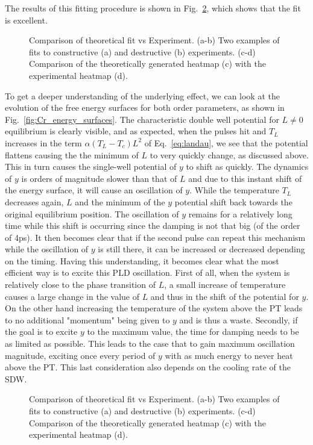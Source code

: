 The results of this fitting procedure is shown in Fig.~\ref{fig:Cr_theoretical_fit}, which shows that the fit is excellent.  
\begin{figure}
\caption{\label{fig:Cr_theoretical_fit} Comparison of theoretical fit vs Experiment. (a-b) Two examples of fits to constructive (a) and destructive (b) experiments. (c-d) Comparison of the theoretically generated heatmap (c) with the experimental heatmap (d).}
\end{figure}
To get a deeper understanding of the underlying effect, we can look at the evolution of the free energy surfaces for both order parameters, as shown in Fig.~\ref{fig:Cr_energy_surfaces}. The characteristic double well potential for $L\neq0$ equilibrium is clearly visible, and as expected, when the pulses hit and $T_L$ increases in the term $\alpha(T_L-T_c)L^2$ of Eq.~\ref{eq:landau}, we see that the potential flattens causing the the minimum of $L$ to very quickly change, as discussed above. This in turn causes the single-well potential of $y$ to shift as quickly. The dynamics of $y$ is orders of magnitude slower than that of $L$ and due to this instant shift of the energy surface, it will cause an oscillation of $y$. While the temperature $T_L$ decreases again, $L$ and the minimum of the $y$ potential shift back towards the original equilibrium position. The oscillation of $y$ remains for a relatively long time while this shift is occurring since the damping is not that big (of the order of 4ps). It then becomes clear that if the second pulse can repeat this mechanism while the oscillation of $y$ is still there, it can be increased or decreased depending on the timing. Having this understanding, it becomes clear what the most efficient way is to excite this PLD oscillation. First of all, when the system is relatively close to the phase transition of $L$, a small increase of temperature causes a large change in the value of $L$ and thus in the shift of the potential for $y$. On the other hand increasing the temperature of the system above the PT leads to no additional "momentum" being given to $y$ and is thus a waste. Secondly, if the goal is to excite $y$ to the maximum value, the time for damping needs to be as limited as possible. This leads to the case that to gain maximum oscillation magnitude, exciting once every period of $y$ with as much energy to never heat above the PT. This last consideration also depends on the cooling rate of the SDW. 

\begin{figure}
\caption{\label{fig:Cr_theoretical_fit} Comparison of theoretical fit vs Experiment. (a-b) Two examples of fits to constructive (a) and destructive (b) experiments. (c-d) Comparison of the theoretically generated heatmap (c) with the experimental heatmap (d).}
\end{figure}

